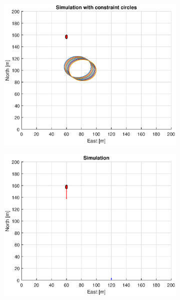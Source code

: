\begin{figure}[!b]
\begin{subfigure}[b]{0.499\textwidth}
    \end{subfigure}
    \hfill
    \\
    \begin{subfigure}[b]{0.49\textwidth}
        \centering
        \includegraphics[width=\textwidth]{Images/Figures/sving_SO/Simple0_f1_Frame2}
    \end{subfigure}
    \hfill
    \begin{subfigure}[b]{0.499\textwidth}
        \centering
        \includegraphics[width=\textwidth]{Images/Figures/sving_SO/Simple0_f600_Frame2}

\end{subfigure}
\end{figure}
